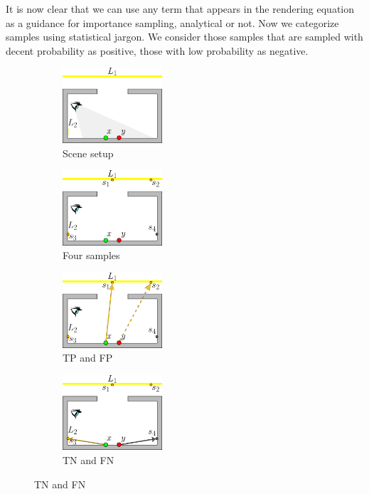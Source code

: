 \documentclass[]{book}
\begin{document}
It is now clear that we can use any term that appears in the rendering equation as a guidance for importance sampling, analytical or not.
Now we categorize samples using statistical jargon.
We consider those samples that are sampled with decent probability as positive, those with low probability as negative.

\begin{figure}[!ht]
	\begin{subfigure}{0.25\textwidth}
		\centering
		\includegraphics[height=1.1in]{img/IMP_1_1.png}
		\caption{Scene setup}
		\label{fig:IMP:sampleClasses:a}
	\end{subfigure}%
	\begin{subfigure}{0.25\textwidth}
		\centering
		\includegraphics[height=1.1in]{img/IMP_1_2.png}
		\caption{Four samples}
		\label{fig:IMP:sampleClasses:b}
	\end{subfigure}%
	\begin{subfigure}{0.25\textwidth}
		\centering
		\includegraphics[height=1.1in]{img/IMP_1_3.png}
		\caption{TP and FP}
		\label{fig:IMP:sampleClasses:c}
	\end{subfigure}%
	\begin{subfigure}{0.25\textwidth}
		\centering
		\includegraphics[height=1.1in]{img/IMP_1_4.png}
		\caption{TN and FN}

\end{subfigure}
\end{figure}
\end{document}
